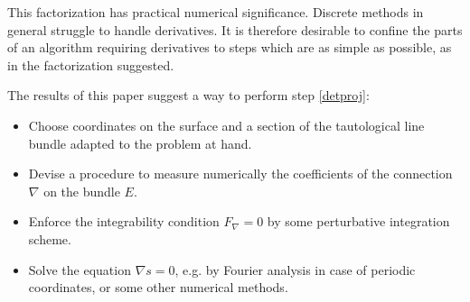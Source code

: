 \documentclass[11pt]{article}
\numberwithin{equation}{section}
\theoremstyle{plain}
\theoremstyle{remark}
\renewcommand{\P}{\mathbb{P}}
\newcommand{\GL}{GL}
\newcommand{\II}{\textnormal{II}}
\begin{document}
This factorization has practical numerical significance. Discrete methods in general struggle to handle derivatives. It is therefore desirable to confine the parts of an algorithm requiring derivatives to steps which are as simple as possible, as in the factorization suggested.

The results of this paper suggest a way to perform step \ref{detproj}:

\begin{itemize}
\itemsep0em
\item{Choose coordinates on the surface and a section of the tautological line bundle adapted to the problem at hand.}
\item{Devise a procedure to measure numerically the coefficients of the connection $\nabla$ on the bundle $E$.}
\item{Enforce the integrability condition $F_\nabla=0$ by some perturbative integration scheme.}
\item{Solve the equation $\nabla s =0$, e.g. by Fourier analysis in case of periodic coordinates, or some other numerical methods.}
\end{itemize}













\end{document}
